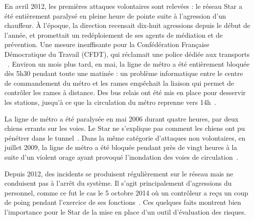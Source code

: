         En avril 2012, les premières attaques volontaires sont relevées : le réseau {\sc Star} a été entièrement paralysé en pleine heure de pointe suite à l'agression d'un chauffeur. À l'époque, la direction recensait dix-huit agressions depuis le début de l'année, et promettait un redéploiement de ses agents de médiation et de prévention. Une mesure insuffisante pour la Confédération Française Démocratique du Travail (CFDT), qui réclamait \og une police dédiée aux transports \fg ~\cite{bus_agression}. Environ un mois plus tard, en mai, la ligne de métro a été entièrement bloquée dès 5h30 pendant toute une matinée : un problème informatique entre le centre de commandement du métro et les rames empêchait la liaison qui permet de contrôler les rames à distance. Des bus relais ont été mis en place pour desservir les stations, jusqu'à ce que la circulation du métro reprenne vers 14h~\cite{metro_info}.
        
        La ligne de métro a été paralysée en mai 2006 durant quatre heures, par deux chiens errants sur les voies. Le {\sc Star} ne s'explique pas comment les chiens ont pu pénétrer dans le tunnel~\cite{chiens_metro}. Dans la même catégorie d'attaques non volontaires, en juillet 2009, la ligne de métro a été bloquée pendant près de vingt heures à la suite d'un violent orage ayant provoqué l'inondation des voies de circulation~\cite{metro_orage}.
        
        Depuis 2012, des incidents se produisent régulièrement sur le réseau mais ne conduisent pas à l'arrêt du système. Il s'agit principalement d'agressions du personnel, comme ce fut le cas le 5 octobre 2014 où un contrôleur a reçu un coup de poing pendant l'exercice de ses fonctions~\cite{coup_poing_rennes}. Ces quelques faits montrent bien l'importance pour le {\sc Star} de la mise en place d'un outil d'évaluation des risques.
